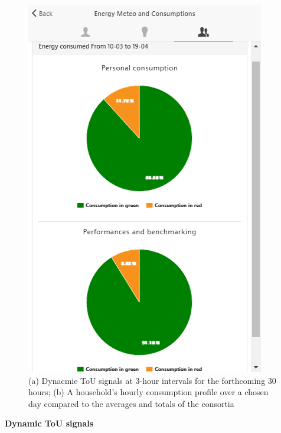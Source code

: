 \begin{figure}
\begin{center}
\begin{minipage}[htb]{0.45\linewidth}
        \end{minipage}
	\hfill 
        \begin{minipage}[htb]{0.45\linewidth}    
         \includegraphics[width=1\linewidth]{img/touperformancechart_indivcoll.png}
        \end{minipage}
      \end{center}
      \caption{(a) Dynacmie ToU signals at 3-hour intervals for the forthcoming 30 hours;  (b) 
      A household's hourly consumption profile over a chosen day compared to the averages and totals of the consortia
}
\label{fig:tou}
\end{figure}

\textbf{Dynamic ToU signals}

